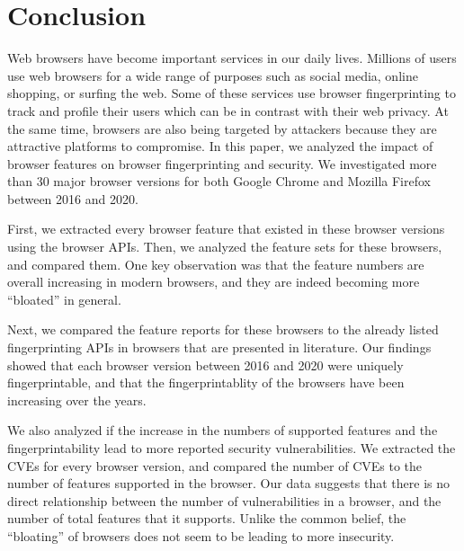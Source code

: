 \section{Conclusion}
\label{sec:conclusion}

Web browsers have become important services in our daily lives.
Millions of users use web browsers for a wide range of purposes such
as social media, online shopping, or surfing the web. Some of these
services use browser fingerprinting to track and profile their users
which can be in contrast with their web privacy. At the same time,
browsers are also being targeted by attackers because they are
attractive platforms to compromise. In this paper, we analyzed the
impact of browser features on browser fingerprinting and security. We
investigated more than 30 major browser versions for both Google
Chrome and Mozilla Firefox between 2016 and 2020.

First, we extracted every browser feature that existed in these
browser versions using the browser APIs. Then, we analyzed the feature
sets for these browsers, and compared them. One key observation was
that the feature numbers are overall increasing in modern browsers,
and they are indeed becoming more ``bloated'' in general.

Next, we compared the feature reports for these browsers to the
already listed fingerprinting APIs in browsers that are presented in
literature. Our findings showed that each browser version between 2016
and 2020 were uniquely fingerprintable, and that the fingerprintablity
of the browsers have been increasing over the years.

We also analyzed if the increase in the numbers of supported features
and the fingerprintability lead to more reported security
vulnerabilities. We extracted the CVEs for every browser version, and
compared the number of CVEs to the number of features supported in the
browser. Our data suggests that there is no direct relationship
between the number of vulnerabilities in a browser, and the number of
total features that it supports. Unlike the common belief, the
``bloating'' of browsers does not seem to be leading to more
insecurity.
